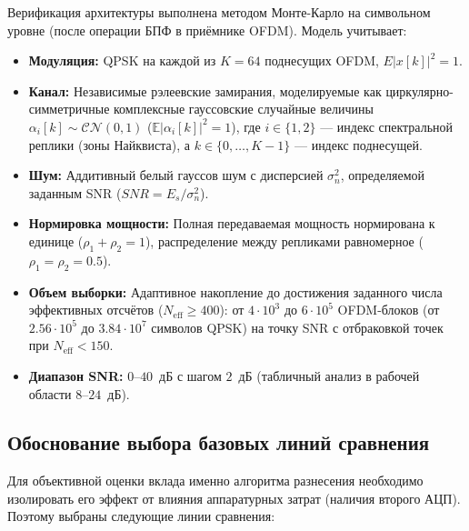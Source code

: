 \documentclass[a4paper,12pt]{article}
\numberwithin{equation}{section}
\newcommand{\E}{\mathbb{E}}
\begin{document}
Верификация архитектуры выполнена методом Монте-Карло на символьном уровне (после операции БПФ в приёмнике OFDM). Модель учитывает:
\begin{itemize}
    \item \textbf{Модуляция:} QPSK на каждой из $K=64$ поднесущих OFDM, $E|x[k]|^2=1$.
    \item \textbf{Канал:} Независимые рэлеевские замирания, моделируемые как циркулярно-симметричные комплексные гауссовские случайные величины $\alpha_i[k] \sim \mathcal{CN}(0, 1)$ ($\E{|\alpha_i[k]|^2}=1$), где $i \in \{1, 2\}$ --- индекс спектральной реплики (зоны Найквиста), а $k \in \{0, \dots, K-1\}$ --- индекс поднесущей.
    \item \textbf{Шум:} Аддитивный белый гауссов шум с дисперсией $\sigma_n^2$, определяемой заданным SNR ($SNR = E_s/\sigma_n^2$).
    \item \textbf{Нормировка мощности:} Полная передаваемая мощность нормирована к единице ($\rho_1 + \rho_2 = 1$), распределение между репликами равномерное ($\rho_1=\rho_2=0.5$).
    \item \textbf{Объем выборки:} Адаптивное накопление до достижения заданного числа эффективных отсчётов ($N_{\text{eff}} \ge 400$): от $4\cdot10^3$ до $6\cdot10^5$ OFDM-блоков (от $2.56\cdot10^5$ до $3.84\cdot10^7$ символов QPSK) на точку SNR с отбраковкой точек при $N_{\text{eff}} < 150$.
    \item \textbf{Диапазон SNR:} $0$--$40$~дБ с шагом $2$~дБ (табличный анализ в рабочей области $8$--$24$~дБ).

\end{itemize}

\subsection{Обоснование выбора базовых линий сравнения}
Для объективной оценки вклада именно алгоритма разнесения необходимо изолировать его эффект от влияния аппаратурных затрат (наличия второго АЦП). Поэтому выбраны следующие линии сравнения:
\end{document}
